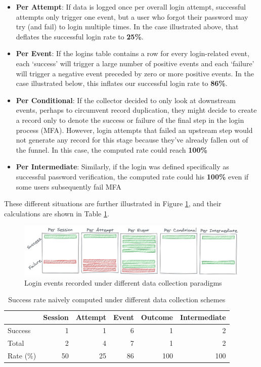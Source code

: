 \documentclass[
]{krantz}
\providecommand{\tightlist}{%
  \setlength{\itemsep}{0pt}\setlength{\parskip}{0pt}}
\begin{document}
\begin{itemize}
\tightlist
\item
  \textbf{Per Attempt}: If data is logged once per overall login attempt, successful attempts only trigger one event, but a user who forgot their password may try (and fail) to login multiple times. In the case illustrated above, that deflates the successful login rate to \textbf{25\%}.
\item
  \textbf{Per Event}: If the logins table contains a row for every login-related event, each `success' will trigger a large number of positive events and each `failure' will trigger a negative event preceded by zero or more positive events. In the case illustrated below, this inflates our successful login rate to \textbf{86\%}.
\item
  \textbf{Per Conditional}: If the collector decided to only look at downstream events, perhaps to circumvent record duplication, they might decide to create a record only to denote the success or failure of the final step in the login process (MFA). However, login attempts that failed an upstream step would not generate any record for this stage because they've already fallen out of the funnel. In this case, the computed rate could reach \textbf{100\%}
\item
  \textbf{Per Intermediate}: Similarly, if the login was defined specifically as successful password verification, the computed rate could his \textbf{100\%} even if some users subsequently fail MFA
\end{itemize}

These different situations are further illustrated in Figure \ref{fig:login-rate}, and their calculations are shown in Table \ref{tab:login-rate-tbl}.

\begin{figure}

{\centering \includegraphics[width=0.9\linewidth]{figures/data-dall/login-rate} 

}

\caption{Login events recorded under different data collection paradigms}\label{fig:login-rate}
\end{figure}

\begin{table}

\caption{\label{tab:login-rate-tbl}Success rate naively computed under different data collection schemes}
\centering
\begin{tabular}[t]{l|r|r|r|r|r}
\hline
  & Session & Attempt & Event & Outcome & Intermediate\\
\hline
Success & 1 & 1 & 6 & 1 & 2\\
\hline
Total & 2 & 4 & 7 & 1 & 2\\
\hline
Rate (\%) & 50 & 25 & 86 & 100 & 100\\
\hline
\end{tabular}
\end{table}
\end{document}
